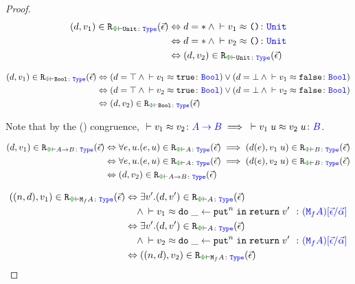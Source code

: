 \begin{framed}
    \begin{proof}
    
        \begin{align*}
            \inLogRelPE{d}{v_1}{\U} & \Leftrightarrow d = \singleton \wedge \zberelation{v_1}{\u}{\U}
            \\ &
            \Leftrightarrow d = \singleton \wedge \zberelation{v_2}{\u}{\U}
            \\ & 
            \Leftrightarrow  \inLogRelPE{d}{v_2}{\U}
        \end{align*}
    
    \begin{align*}
        \inLogRelPE{d}{v_1}{\B} & \Leftrightarrow (d = \top \wedge \zberelation{v_1}{\t}{\B}) \vee (d = \bot \wedge \zberelation{v_1}{\f}{\B})
        \\ &
        \Leftrightarrow (d = \top \wedge \zberelation{v_2}{\t}{\B}) \vee (d = \bot \wedge \zberelation{v_2}{\f}{\B})
        \\ & 
        \Leftrightarrow  \inLogRelPE{d}{v_2}{\B}
    \end{align*}
    
    \case{\tfun}
    Note that by the (\textit{\eqapply}) congruence, $\zberelation{v_1}{v_2}{\ab}\implies \zberelation{\apply{v_1}{u}}{\apply{v_2}{u}}{B}$.
    
    \begin{align*}
        \inLogRelPE{d}{v_1}{\ab} & \Leftrightarrow \forall e, u. \inLogRelPE{e}{u}{A} \implies \inLogRelPE{d(e)}{\apply{v_1}{u}}{B} \\
        & \Leftrightarrow  \forall e, u. \inLogRelPE{e}{u}{A} \implies \inLogRelPE{d(e)}{\apply{v_2}{u}}{B} \\
        & \Leftrightarrow  \inLogRelPE{d}{v_2}{\ab}
    \end{align*}
    
    \case{\teffect}
    \begin{align*}
        \inLogRelPE{(n, d)}{v_1}{\M{f}{A}} & \Leftrightarrow \exists v'. \inLogRelPE{d}{v'}{A}
        \\ & \quad\wedge \zberelation{v_1}{\doin{\_}{\put^n}{\return{v'}}}{(\M{f}{A})\ssub{\av}{\ev}}
        \\
        & \Leftrightarrow\exists v'. \inLogRelPE{d}{v'}{A}
        \\ & \quad\wedge \zberelation{v_2}{\doin{\_}{\put^n}{\return{v'}}}{(\M{f}{A})\ssub{\av}{\ev}} \\
        & \Leftrightarrow  \inLogRelPE{(n, d)}{v_2}{\M{f}{A}}
    \end{align*}
    

\end{proof}
\end{framed}

